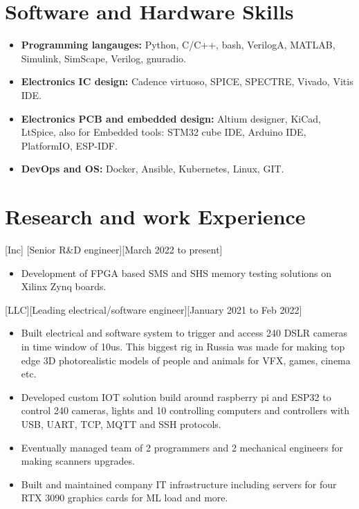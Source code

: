 \documentclass{article}
\begin{document}
\section{Software and Hardware Skills}
\begin{itemize}
\item \textbf{Programming langauges:} Python, C/C++, bash, VerilogA, MATLAB, Simulink, SimScape, Verilog, gnuradio. 
\item \textbf{Electronics IC design:} Cadence virtuoso, SPICE, SPECTRE, Vivado, Vitis IDE.
\item \textbf{Electronics PCB and embedded design:} Altium designer, KiCad, LtSpice, also for Embedded tools: STM32 cube IDE, Arduino IDE, PlatformIO, ESP-IDF.
\item \textbf{DevOps and OS:} Docker, Ansible, Kubernetes, Linux, GIT.
\end{itemize}

\section{Research and work Experience}
 

 
[Inc]
[Senior R\&D engineer][March 2022 to present]
   \begin{itemize}
      \item Development of FPGA based SMS and SHS memory testing solutions on Xilinx Zynq boards.
   \end{itemize}

[LLC][Leading electrical/software engineer][January 2021 to Feb 2022]
\begin{itemize}
   \item Built electrical and software system to trigger and access 240 DSLR cameras in time window of 10us. This biggest rig in Russia was made for making top edge 3D photorealistic models of people and animals for VFX, games, cinema etc.
   \item Developed custom IOT solution build around raspberry pi and ESP32 to control 240 cameras, lights and 10 controlling computers and controllers with USB, UART, TCP, MQTT and SSH protocols.
   \item Eventually managed team of 2 programmers and 2 mechanical engineers for making scanners upgrades.
   \item Built and maintained company IT infrastructure including servers for four RTX 3090 graphics cards for ML load and more.
   \end{itemize}
\end{document}
